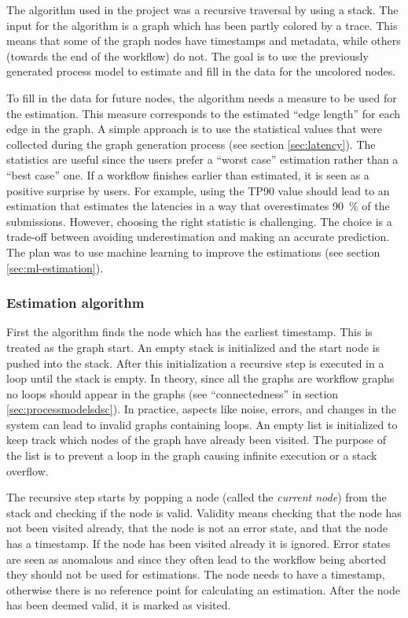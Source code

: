 The algorithm used in the project was a recursive traversal by using a stack.
The input for the algorithm is a graph which has been partly colored by a trace.
This means that some of the graph nodes have timestamps and metadata, while others (towards the end of the workflow) do not.
The goal is to use the previously generated process model to estimate
and fill in the data for the uncolored nodes.

To fill in the data for future nodes, the algorithm needs a measure to be used for the estimation. 
This measure corresponds to the estimated ``edge length'' for each edge in the graph.
A simple approach is to use the statistical values that were collected during the graph generation process (see section \ref{sec:latency}).
The statistics are useful since the users prefer a ``worst case'' estimation rather than a ``best case'' one.
If a workflow finishes earlier than estimated, it is seen as a positive surprise by users.
For example, using the TP90 value should lead to an estimation that estimates the latencies in a way that overestimates 90~\% of the submissions.
However, choosing the right statistic is challenging.
The choice is a trade-off between avoiding underestimation and making an accurate prediction.
The plan was to use machine learning to improve the estimations (see section \ref{sec:ml-estimation}).

\subsubsection{Estimation algorithm}
First the algorithm finds the node which has the earliest timestamp.
This is treated as the graph start.
An empty stack is initialized and the start node is pushed into the stack.
After this initialization a recursive step is executed in a loop until the stack is empty.
In theory, since all the graphs are workflow graphs no loops should appear in the graphs (see ``connectedness'' in section \ref{sec:processmodelsdsc}). 
In practice, aspects like noise, errors, and changes in the system can lead to invalid graphs containing loops.
An empty list is initialized to keep track which nodes of the graph have already been visited.
The purpose of the list is to prevent a loop in the graph causing infinite execution or a stack overflow.

The recursive step starts by popping a node (called the \emph{current node}) from the stack and checking if the node is valid.
Validity means checking that the node has not been visited already, that the node is not an error state, and that the node has a timestamp.
If the node has been visited already it is ignored.
Error states are seen as anomalous and since they often lead to the workflow being aborted they should not be used for estimations.
The node needs to have a timestamp, otherwise there is no reference point for calculating an estimation.
After the node has been deemed valid, it is marked as visited.

